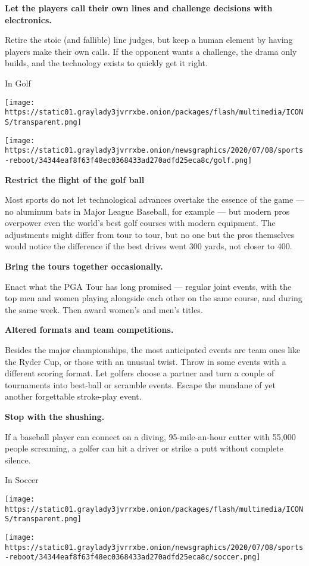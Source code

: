 \textbf{Let the players call their own lines and challenge decisions
with electronics.}

Retire the stoic (and fallible) line judges, but keep a human element by
having players make their own calls. If the opponent wants a challenge,
the drama only builds, and the technology exists to quickly get it
right.

In Golf

\texttt{[image: https://static01.graylady3jvrrxbe.onion/packages/flash/multimedia/ICONS/transparent.png]}

\texttt{[image: https://static01.graylady3jvrrxbe.onion/newsgraphics/2020/07/08/sports-reboot/34344eaf8f63f48ec0368433ad270adfd25eca8c/golf.png]}

\textbf{Restrict the flight of the golf ball}

Most sports do not let technological advances overtake the essence of
the game --- no aluminum bats in Major League Baseball, for example ---
but modern pros overpower even the world's best golf courses with modern
equipment. The adjustments might differ from tour to tour, but no one
but the pros themselves would notice the difference if the best drives
went 300 yards, not closer to 400.

\textbf{Bring the tours together occasionally.}

Enact what the PGA Tour has long promised --- regular joint events, with
the top men and women playing alongside each other on the same course,
and during the same week. Then award women's and men's titles.

\textbf{Altered formats and team competitions.}

Besides the major championships, the most anticipated events are team
ones like the Ryder Cup, or those with an unusual twist. Throw in some
events with a different scoring format. Let golfers choose a partner and
turn a couple of tournaments into best-ball or scramble events. Escape
the mundane of yet another forgettable stroke-play event.

\textbf{Stop with the shushing.}

If a baseball player can connect on a diving, 95-mile-an-hour cutter
with 55,000 people screaming, a golfer can hit a driver or strike a putt
without complete silence.

In Soccer

\texttt{[image: https://static01.graylady3jvrrxbe.onion/packages/flash/multimedia/ICONS/transparent.png]}

\texttt{[image: https://static01.graylady3jvrrxbe.onion/newsgraphics/2020/07/08/sports-reboot/34344eaf8f63f48ec0368433ad270adfd25eca8c/soccer.png]}

